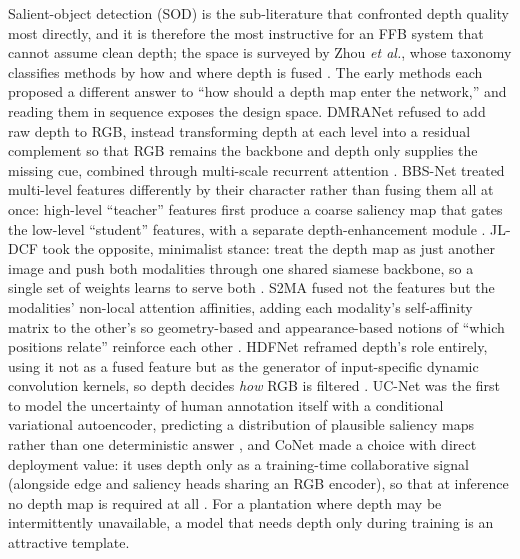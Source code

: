Salient-object detection (SOD) is the sub-literature that confronted depth quality most directly, and it is therefore the most instructive for an FFB system that cannot assume clean depth; the space is surveyed by Zhou \textit{et al.}, whose taxonomy classifies methods by how and where depth is fused \cite{zhou2021rgbdsurvey}. The early methods each proposed a different answer to ``how should a depth map enter the network,'' and reading them in sequence exposes the design space. DMRANet refused to add raw depth to RGB, instead transforming depth at each level into a residual complement so that RGB remains the backbone and depth only supplies the missing cue, combined through multi-scale recurrent attention \cite{piao2019dmra}. BBS-Net treated multi-level features differently by their character rather than fusing them all at once: high-level ``teacher'' features first produce a coarse saliency map that gates the low-level ``student'' features, with a separate depth-enhancement module \cite{fan2020bbsnet}. JL-DCF took the opposite, minimalist stance: treat the depth map as just another image and push both modalities through one shared siamese backbone, so a single set of weights learns to serve both \cite{fu2020jldcf}. S2MA fused not the features but the modalities' non-local attention affinities, adding each modality's self-affinity matrix to the other's so geometry-based and appearance-based notions of ``which positions relate'' reinforce each other \cite{liu2020s2ma}. HDFNet reframed depth's role entirely, using it not as a fused feature but as the generator of input-specific dynamic convolution kernels, so depth decides \emph{how} RGB is filtered \cite{pang2020hdfnet}. UC-Net was the first to model the uncertainty of human annotation itself with a conditional variational autoencoder, predicting a distribution of plausible saliency maps rather than one deterministic answer \cite{zhang2020ucnet}, and CoNet made a choice with direct deployment value: it uses depth only as a training-time collaborative signal (alongside edge and saliency heads sharing an RGB encoder), so that at inference no depth map is required at all \cite{ji2020conet}. For a plantation where depth may be intermittently unavailable, a model that needs depth only during training is an attractive template.


